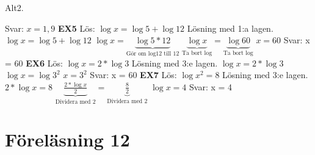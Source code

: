 \documentclass[a4paper,11pt]{article}
\begin{document}
\begin{flushleft}
Alt2.\newline

Svar: $ x = 1,9$
\newline\newline
\textbf{EX5}\newline
Lös: $\log{x} = \log{5}+\log{12}$\newline
Lösning med 1:a lagen.\newline\newline
$ \log{x} = \log{5}+\log{12} $\newline
$ \log{x} = \underbrace{\log{5*12}}_{\text{Gör om log12 till 12}} $ \newline\newline
$ \underbrace{\log{x}}_{\text{Ta bort log}} = \underbrace{\log{60}}_{\text{Ta bort log}}  $\newline\newline
$ x = 60$\newline
Svar: x = 60
\newline\newline
\textbf{EX6}\newline
Lös: $\log{x} = 2*\log{3}$\newline
Lösning med 3:e lagen. \newline\newline
$ \log{x} = 2*\log{3} $\newline
$ \log{x} = \log{3^2} $ \newline\newline
$ x = 3^2 $\newline\newline
Svar: x = 60
\newline\newline
\textbf{EX7}\newline
Lös: $\log{x^2} = 8$\newline
Lösning med 3:e lagen. \newline\newline
$ 2*\log{x} = 8 $\newline\newline
$ \underbrace{\frac{2*\log{x}}{2}}_{\text{Dividera med 2}} = \underbrace{\frac{8}{2}}_{\text{Dividera med 2}}  $ \newline\newline
$ \log{x} = 4 $\newline\newline
Svar: x = 4
\section{Föreläsning 12}

\end{flushleft}
\end{document}
